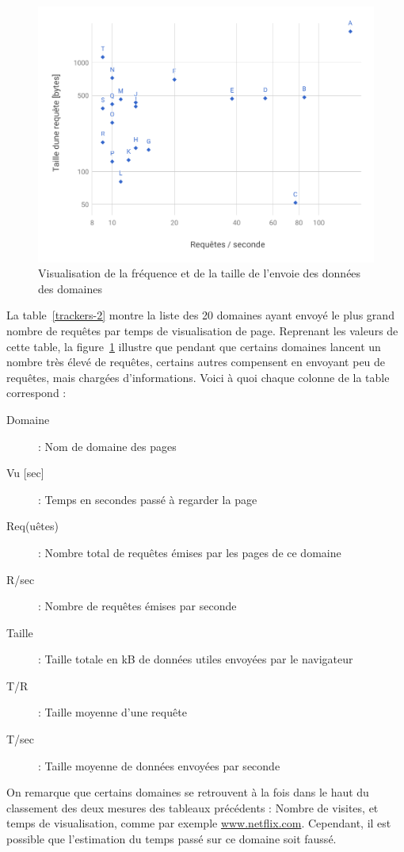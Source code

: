 			\begin{figure}[!h]
				\centering
				\includegraphics[height=0.7\textwidth]{images/results/chart-trackers}
				\caption{Visualisation de la fréquence et de la taille de l'envoie des données des domaines}
				\label{trackers-vis}
			\end{figure}

			La table~\ref{trackers-2} montre la liste des 20 domaines ayant envoyé le plus grand nombre de requêtes par temps de visualisation de page. Reprenant les valeurs de cette table, la figure~\ref{trackers-vis} illustre que pendant que certains domaines lancent un nombre très élevé de requêtes, certains autres compensent en envoyant peu de requêtes, mais chargées d'informations. Voici à quoi chaque colonne de la table correspond :
			\begin{description}
				\item[Domaine] : Nom de domaine des pages
				\item[Vu {[}sec{]}] : Temps en secondes passé à regarder la page
				\item[Req(uêtes)] : Nombre total de requêtes émises par les pages de ce domaine
				\item[R/sec] : Nombre de requêtes émises par seconde
				\item[Taille] : Taille totale en kB de données utiles envoyées par le navigateur
				\item[T/R] : Taille moyenne d'une requête
				\item[T/sec] : Taille moyenne de données envoyées par seconde
			\end{description}

			On remarque que certains domaines se retrouvent à la fois dans le haut du classement des deux mesures des tableaux précédents : Nombre de visites, et temps de visualisation, comme par exemple \url{www.netflix.com}. Cependant, il est possible que l'estimation du temps passé sur ce domaine soit faussé.

